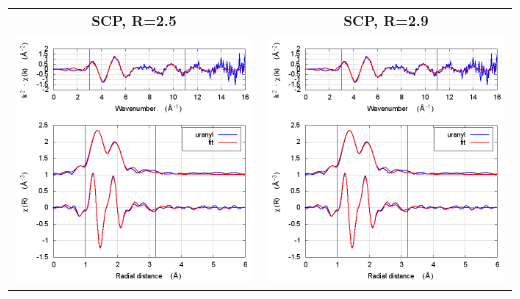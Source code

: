 \documentclass[11pt]{article}
\begin{document}
\begin{center}
  \begin{tabular}{cc}
    \textbf{SCP, R=2.5} & \textbf{SCP, R=2.9} \\ 
    \includegraphics[width=.45\linewidth]{uranyl/scf/fit_withSCF_2.5.png} & 
    \includegraphics[width=.45\linewidth]{uranyl/scf/fit_withSCF_2.9.png} \\
  \end{tabular}
\end{center}
\end{document}

